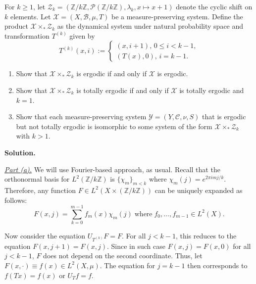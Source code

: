\documentclass{template}
\begin{document}
\begin{problem}[Exercise 5]
    For $k \geq 1$, let $\mathcal{Z}_k = (\mathbb{Z}/k\mathbb{Z}, \mathcal{P}(\mathbb{Z}/k\mathbb{Z}), \lambda_k, x \mapsto x+1)$ denote 
    the cyclic shift on $k$ elements. Let $\mathcal{X}=(X,\mathcal{B},\mu,T)$ be a measure-preserving system.
    Define the product $\mathcal{X} \times_* \mathcal{Z}_k$ as the dynamical system under natural probability space 
    and transformation $T^{(k)}$ given by 
    \begin{equation*}
        T^{(k)}(x,i) := \begin{cases}
            (x,i+1), \, 0 \leq i < k-1, \\
            (T(x), 0), \, i=k-1.
        \end{cases}
    \end{equation*} 
    \begin{enumerate}
        \item[(a)] Show that $\mathcal{X} \times_* \mathcal{Z}_k$ is ergodic if and only if $\mathcal{X}$ is ergodic.
        \item[(b)] Show that $\mathcal{X} \times_* \mathcal{Z}_k$ is totally ergodic if and only if $\mathcal{X}$ is totally ergodic and $k=1$.
        \item[(c)] Show that each measure-preserving system $\mathcal{Y} =
        (Y,\mathcal{C},\nu,S)$ that is ergodic but not totally ergodic is isomorphic to some
        system of the form $\mathcal{X} \times_* \mathcal{Z}_k$ with $k>1$.  
    \end{enumerate}
\end{problem}

\textbf{Solution.} 

\underline{\textit{Part (a).}} We will use Fourier-based approach, as usual. Recall that the
orthonormal basis for $L^2(\mathbb{Z}/k\mathbb{Z})$ is $\{\chi_m\}_{m<k}$ where
$\chi_m(j) = e^{2\pi i mj/k}$. Therefore, any function $F \in L^2(X \times (\mathbb{Z}/k\mathbb{Z}))$
can be uniquely expanded as follows:
\begin{equation*}
    F(x,j) = \sum_{k=0}^{m-1} f_m(x)\chi_m(j) \; \text{where} \; f_0, \dots, f_{m-1} \in L^2(X).
\end{equation*}

Now consider the equation $U_{T^{(k)}}F = F$. For all $j<k-1$, this reduces to the
equation $F(x,j+1)=F(x,j)$. Since in such case $F(x,j)=F(x,0)$ for all $j <
k-1$, $F$ does not depend on the second coordinate. Thus, let $F(x,\cdot) \equiv
f(x) \in L^2(X,\mu)$. The equation for $j=k-1$ then corresponds to $f(Tx) = f(x)$
or $U_Tf=f$. 
\end{document}
